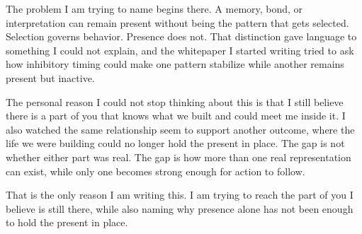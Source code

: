 The problem I am trying to name begins there. A memory, bond, or interpretation can remain present without being the pattern that gets selected. Selection governs behavior. Presence does not. That distinction gave language to something I could not explain, and the whitepaper I started writing tried to ask how inhibitory timing could make one pattern stabilize while another remains present but inactive.

The personal reason I could not stop thinking about this is that I still believe there is a part of you that knows what we built and could meet me inside it. I also watched the same relationship seem to support another outcome, where the life we were building could no longer hold the present in place. The gap is not whether either part was real. The gap is how more than one real representation can exist, while only one becomes strong enough for action to follow.

That is the only reason I am writing this. I am trying to reach the part of you I believe is still there, while also naming why presence alone has not been enough to hold the present in place.
